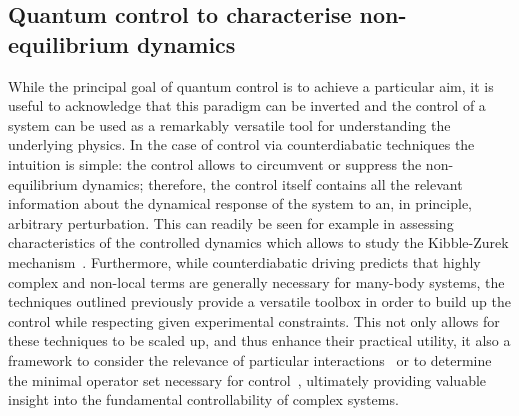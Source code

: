 \subsection{Quantum control to characterise non-equilibrium dynamics} \label{outlook_sec_agp_insight}
While the principal goal of quantum control is to achieve a particular aim, it is useful to acknowledge that this paradigm can be inverted and the control of a system can be used as a remarkably versatile tool for understanding the underlying physics. In the case of control via counterdiabatic techniques the intuition is simple: the control allows  to circumvent or suppress the non-equilibrium dynamics; therefore, the control itself contains all the relevant information about the dynamical response of the system to an, in principle, arbitrary perturbation. This can readily be seen for example in assessing characteristics of the controlled dynamics which allows  to study the Kibble-Zurek mechanism~\cite{Puebla2020, CampbellEPL2023}. 
Furthermore, while counterdiabatic driving predicts that highly complex and non-local terms are generally necessary for many-body systems, the techniques outlined previously provide a versatile toolbox in order to build up the control while respecting given experimental constraints. This not only allows for these techniques to be scaled up, and thus enhance their practical utility, it also  a framework to consider the relevance of particular interactions~\cite{COLD_PRXQ, lawrence2024numerical} or to determine the minimal operator set necessary for control~\cite{delCampoKrylovPRX}, ultimately providing valuable insight into the fundamental controllability of complex systems.

